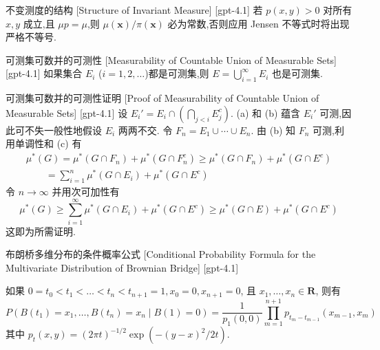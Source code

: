\documentclass[UTF8]{ctexart}
\begin{document}
    
    
    \begin{crl}
        {不变测度的结构}
        [Structure of Invariant Measure]
        [gpt-4.1]
        若 $p(x, y) > 0$ 对所有 $x, y$ 成立,且 $\mu p = \mu$,则 $\mu(\boldsymbol{x}) / \pi(\boldsymbol{x})$ 必为常数,否则应用 Jensen 不等式时将出现严格不等号.

    \end{crl}
    
    
    
    \begin{thm}
        {可测集可数并的可测性}
        [Measurability of Countable Union of Measurable Sets]
        [gpt-4.1]
        如果集合 $E_i$ ($i=1,2,\ldots$)都是可测集,则 $E = \bigcup_{i=1}^{\infty} E_i$ 也是可测集.
    \end{thm}
    
    
    
    \begin{prf}
        {可测集可数并的可测性证明}
        [Proof of Measurability of Countable Union of Measurable Sets]
        [gpt-4.1]
        设 $E_i' = E_i \cap \left( \bigcap_{j < i} E_j^c \right)$.
(a) 和 (b) 蕴含 $E_i'$ 可测,因此可不失一般性地假设 $E_i$ 两两不交.
令 $F_n = E_1 \cup \cdots \cup E_n$.
由 (b) 知 $F_n$ 可测,利用单调性和 (c) 有
\[
\begin{array} { l } { { \mu ^ { * } ( G ) = \mu ^ { * } ( G \cap F _ { n } ) + \mu ^ { * } ( G \cap F _ { n } ^ { c } ) \geq \mu ^ { * } ( G \cap F _ { n } ) + \mu ^ { * } ( G \cap E ^ { c } ) } } \\ { { \qquad = \displaystyle \sum _ { i = 1 } ^ { n } \mu ^ { * } ( G \cap E _ { i } ) + \mu ^ { * } ( G \cap E ^ { c } ) } } \end{array}
\]
令 $n \to \infty$ 并用次可加性有
\[
\mu ^ { * } ( G ) \geq \sum _ { i = 1 } ^ { \infty } \mu ^ { * } ( G \cap E _ { i } ) + \mu ^ { * } ( G \cap E ^ { c } ) \geq \mu ^ { * } ( G \cap E ) + \mu ^ { * } ( G \cap E ^ { c } )
\]
这即为所需证明.
    \end{prf}
    
    
    
    \begin{thm}
        {布朗桥多维分布的条件概率公式}
        [Conditional Probability Formula for the Multivariate Distribution of Brownian Bridge]
        [gpt-4.1]
        
如果 $0 = t_{0} < t_{1} < \ldots < t_{n} < t_{n+1} = 1, x_{0} = 0, x_{n+1} = 0$, 且 $x_{1}, \ldots, x_{n} \in \mathbf{R}$, 则有
\[
P( B( t_{1} ) = x_{1}, \ldots, B( t_{n} ) = x_{n} \mid B( 1 ) = 0 ) 
= \frac{1}{p_{1}(0, 0)} \prod_{m=1}^{n+1} p_{t_{m} - t_{m - 1}}( x_{m - 1}, x_{m} )
\]
其中 $p_{t}(x, y) = (2 \pi t)^{-1/2} \exp\left( - (y - x)^2 / 2t \right )$.

    \end{thm}
    
\end{document}
